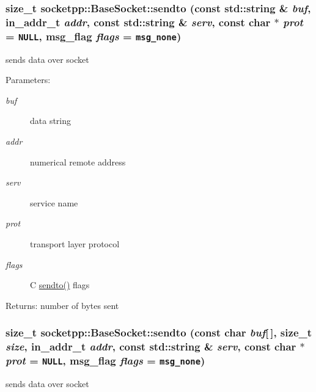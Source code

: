 \begin{CompactItemize}
{\subsubsection[{sendto}]{\setlength{\rightskip}{0pt plus 5cm}size\_\-t socketpp::BaseSocket::sendto (const std::string \& {\em buf}, \/  in\_\-addr\_\-t {\em addr}, \/  const std::string \& {\em serv}, \/  const char $\ast$ {\em prot} = {\tt NULL}, \/  msg\_\-flag {\em flags} = {\tt msg\_\-none})}}
\label{classsocketpp_1_1BaseSocket_d3b26301f9af47aa8bdcf38c32ba8c9d}


sends data over socket 

\begin{Desc}
\item[Parameters:]
\begin{description}
\item[{\em buf}]data string \item[{\em addr}]numerical remote address \item[{\em serv}]service name \item[{\em prot}]transport layer protocol \item[{\em flags}]C \hyperlink{classsocketpp_1_1BaseSocket_d6df36281c6fce81e5c4c493ac91a6f8}{sendto()} flags \end{description}
\end{Desc}
\begin{Desc}
\item[Returns:]number of bytes sent \end{Desc}
\hypertarget{classsocketpp_1_1BaseSocket_66dd5d38b741346d3b37cff6d26e7b8c}{
\subsubsection[{sendto}]{\setlength{\rightskip}{0pt plus 5cm}size\_\-t socketpp::BaseSocket::sendto (const char {\em buf}\mbox{[}$\,$\mbox{]}, \/  size\_\-t {\em size}, \/  in\_\-addr\_\-t {\em addr}, \/  const std::string \& {\em serv}, \/  const char $\ast$ {\em prot} = {\tt NULL}, \/  msg\_\-flag {\em flags} = {\tt msg\_\-none})}}
\label{classsocketpp_1_1BaseSocket_66dd5d38b741346d3b37cff6d26e7b8c}


sends data over socket 


\end{CompactItemize}
